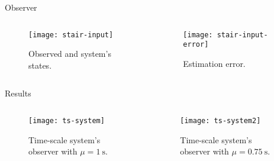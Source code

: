 \begin{slide}{Observer}
  \begin{columns}[c]
    \begin{column}{0.55\textwidth}
      \begin{figure}[ht!]
        \centering
        \texttt{[image: stair-input]}
        \caption{Observed and system's states.}%
      \end{figure}
    \end{column}%
    \hfill%
    \begin{column}{0.55\textwidth}
      \begin{figure}[ht!]
        \centering
        \texttt{[image: stair-input-error]}
        \caption{Estimation error.}%
      \end{figure}
    \end{column}%
  \end{columns}
\end{slide}

\begin{slide}{Results}
  \begin{columns}[c]
    \begin{column}{0.55\textwidth}
      \begin{figure}[ht!]
        \centering
        \texttt{[image: ts-system]}
        \caption{Time-scale system's observer with \(\mu=\SI{1}{\second}\).}%
      \end{figure}
    \end{column}%
    \hfill%
    \begin{column}{0.55\textwidth}
      \begin{figure}[ht!]
        \centering
        \texttt{[image: ts-system2]}
        \caption{Time-scale system's observer with \(\mu=\SI{0.75}{\second}\).}%
      \end{figure}
    \end{column}%
  \end{columns}
\end{slide}
